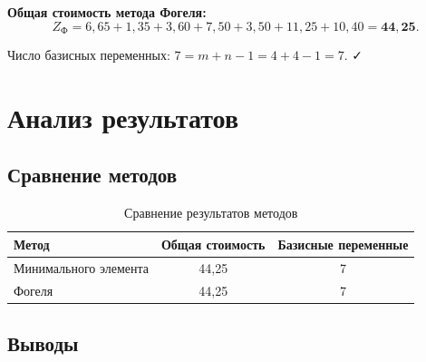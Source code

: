 \documentclass[a4paper, final]{article}
\begin{document}
\textbf{Общая стоимость метода Фогеля:}
\[
Z_{\text{Ф}} = 6{,}65 + 1{,}35 + 3{,}60 + 7{,}50 + 3{,}50 + 11{,}25 + 10{,}40 = \mathbf{44{,}25}.
\]

Число базисных переменных: $7 = m + n - 1 = 4 + 4 - 1 = 7$. ✓

\newpage

\section{Анализ результатов}

\subsection{Сравнение методов}

\begin{table}[h!]
\centering
\caption{Сравнение результатов методов}
\label{tab:methods_compare}
\renewcommand{\arraystretch}{1.4}
\begin{tabular}{|l|c|c|}
\hline
Метод & Общая стоимость & Базисные переменные \\
\hline
Минимального элемента & 44,25 & 7 \\
\hline
Фогеля & 44,25 & 7 \\
\hline
\end{tabular}
\end{table}

\subsection{Выводы}
\end{document}
